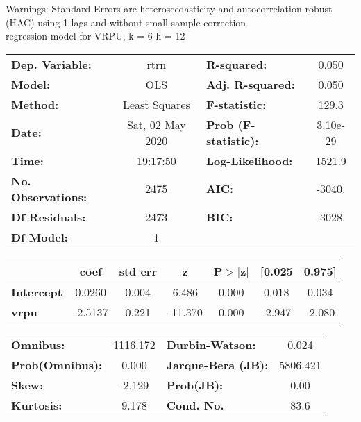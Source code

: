 Warnings: \newline
 [1] Standard Errors are heteroscedasticity and autocorrelation robust (HAC) using 1 lags and without small sample correction\\ 

regression model for VRPU, k = 6 h = 12\begin{center}
\begin{tabular}{lclc}
\toprule
\textbf{Dep. Variable:}    &       rtrn       & \textbf{  R-squared:         } &     0.050   \\
\textbf{Model:}            &       OLS        & \textbf{  Adj. R-squared:    } &     0.050   \\
\textbf{Method:}           &  Least Squares   & \textbf{  F-statistic:       } &     129.3   \\
\textbf{Date:}             & Sat, 02 May 2020 & \textbf{  Prob (F-statistic):} &  3.10e-29   \\
\textbf{Time:}             &     19:17:50     & \textbf{  Log-Likelihood:    } &    1521.9   \\
\textbf{No. Observations:} &        2475      & \textbf{  AIC:               } &    -3040.   \\
\textbf{Df Residuals:}     &        2473      & \textbf{  BIC:               } &    -3028.   \\
\textbf{Df Model:}         &           1      & \textbf{                     } &             \\
\bottomrule
\end{tabular}
\begin{tabular}{lcccccc}
                   & \textbf{coef} & \textbf{std err} & \textbf{z} & \textbf{P$> |$z$|$} & \textbf{[0.025} & \textbf{0.975]}  \\
\midrule
\textbf{Intercept} &       0.0260  &        0.004     &     6.486  &         0.000        &        0.018    &        0.034     \\
\textbf{vrpu}      &      -2.5137  &        0.221     &   -11.370  &         0.000        &       -2.947    &       -2.080     \\
\bottomrule
\end{tabular}
\begin{tabular}{lclc}
\textbf{Omnibus:}       & 1116.172 & \textbf{  Durbin-Watson:     } &    0.024  \\
\textbf{Prob(Omnibus):} &   0.000  & \textbf{  Jarque-Bera (JB):  } & 5806.421  \\
\textbf{Skew:}          &  -2.129  & \textbf{  Prob(JB):          } &     0.00  \\
\textbf{Kurtosis:}      &   9.178  & \textbf{  Cond. No.          } &     83.6  \\
\bottomrule
\end{tabular}
\end{center}

